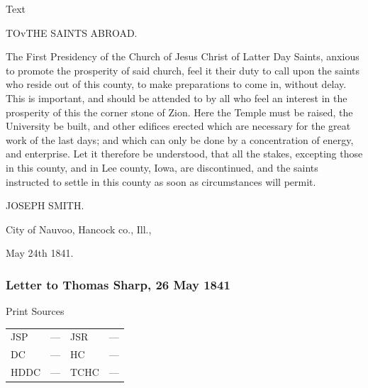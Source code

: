 			\begin{description}
				\item[Text]
			\end{description}
			
				\begin{tightcenter}
					TOvTHE SAINTS ABROAD.
				\end{tightcenter}

				The First Presidency of the Church of Jesus Christ of Latter Day Saints, anxious to promote the prosperity of said church, feel it their duty to call upon the saints who reside out of this county, to make preparations to come in, without delay. This is important, and should be attended to by all who feel an interest in the prosperity of this the corner stone of Zion. Here the Temple must be raised, the University be built, and other edifices erected which are necessary for the great work of the last days; and which can only be done by a concentration of energy, and enterprise. Let it therefore be understood, that all the stakes, excepting those in this county, and in Lee county, Iowa, are discontinued, and the saints instructed to settle in this county as soon as circumstances will permit.

				\begin{tightright}
					JOSEPH SMITH.
				\end{tightright}

				City of Nauvoo, Hancock co., Ill.,

				May 24th 1841.
				
		\subsubsection{Letter to Thomas Sharp, 26 May 1841}
			\label{EMS-1841-JS-26-MAY-1841}
			
			\begin{description}
				\item[Print Sources]
			\end{description}

			\begin{tabular}{p{0.5in}p{1in}p{0.5in}p{1in}}
				JSP	 	& ---		& JSR 		& --- \\
				DC	 	& ---		& HC 		& --- \\
				HDDC 	& ---		& TCHC 		& --- \\
			\end{tabular}
			
